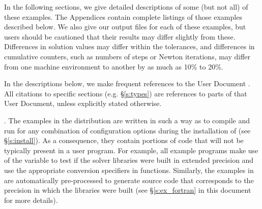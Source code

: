 \vspace{0.2in}\noindent 
In the following sections, we give detailed descriptions of some (but
not all) of these examples.  The Appendices contain complete listings
of those examples described below.  We also give our output files for
each of these examples, but users should be cautioned that their
results may differ slightly from these.  Differences in solution
values may differ within the tolerances, and differences in cumulative
counters, such as numbers of steps or Newton iterations, may differ
from one machine environment to another by as much as 10\% to 20\%.

In the descriptions below, we make frequent references to the {\kinsol}
User Document \cite{kinsol2.2.0_ug}.  All citations to specific sections
(e.g. \S\ref{s:types}) are references to parts of that User Document, unless
explicitly stated otherwise.

\vspace{0.2in}. 
The examples in the {\kinsol} distribution are written in such a way as
to compile and run for any combination of configuration options during
the installation of {\sundials} (see \S\ref{s:install}). As a consequence,
they contain portions of code that will not be typically present in a
user program. For example, all {\C} example programs make use of the
variable  to test if the solver libraries
were built in extended precision and use the appropriate conversion 
specifiers in  functions. Similarly, the {\F} examples in
{\fkinsol} are automatically pre-processed to generate source code that
corresponds to the precision in which the {\kinsol} libraries were built
(see \S\ref{s:ex_fortran} in this document for more details).

